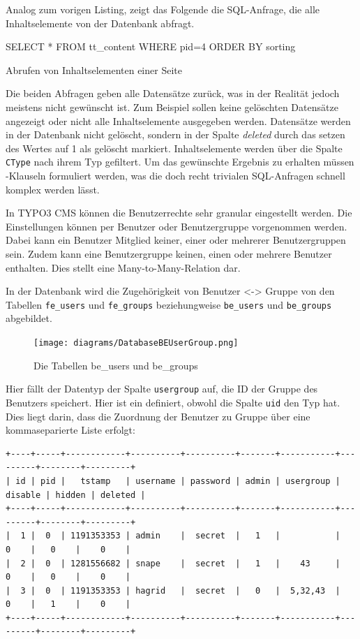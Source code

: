 Analog zum vorigen Listing, zeigt das Folgende die SQL-Anfrage, die alle Inhaltselemente von der Datenbank abfragt.

\begin{listing}
	\begin{phpcode}
SELECT * FROM tt_content WHERE pid=4 ORDER BY sorting
	\end{phpcode}
	\caption{Abrufen von Inhaltselementen einer Seite}
	\label{lst:getContentElements}
\end{listing}

Die beiden Abfragen geben alle Datensätze zurück, was in der Realität jedoch meistens nicht gewünscht ist. Zum Beispiel sollen keine gelöschten Datensätze angezeigt oder nicht alle Inhaltselemente ausgegeben werden. Datensätze werden in der Datenbank nicht gelöscht, sondern in der Spalte \textit{deleted} durch das setzen des Wertes auf 1 als gelöscht markiert. Inhaltselemente werden über die Spalte \texttt{CType} nach ihrem Typ gefiltert. Um das gewünschte Ergebnis zu erhalten müssen -Klauseln formuliert werden, was die doch recht trivialen SQL-Anfragen schnell komplex werden lässt.

In TYPO3 CMS können die Benutzerrechte sehr granular eingestellt werden. Die Einstellungen können per Benutzer oder Benutzergruppe vorgenommen werden.
Dabei kann ein Benutzer Mitglied keiner, einer oder mehrerer Benutzergruppen sein. Zudem kann eine Benutzergruppe keinen, einen oder mehrere Benutzer enthalten. Dies stellt eine Many-to-Many-Relation dar.

In der Datenbank wird die Zugehörigkeit von Benutzer <-> Gruppe von den Tabellen \texttt{fe\_users} und \texttt{fe\_groups} beziehungweise \texttt{be\_users} und \texttt{be\_groups} abgebildet.

\begin{figure}[H]
	\centering
	\texttt{[image: diagrams/DatabaseBEUserGroup.png]}
	\caption{Die Tabellen be\_users und be\_groups}
	\label{fig:beUsersAndBeGroups}
\end{figure}

Hier fällt der Datentyp der Spalte \texttt{usergroup} auf, die ID der Gruppe des Benutzers speichert. Hier ist ein  definiert, obwohl die Spalte \texttt{uid} den Typ  hat. Dies liegt darin, dass die Zuordnung der Benutzer zu Gruppe über eine kommaseparierte Liste erfolgt:

\begin{Verbatim}[samepage=true]
+----+-----+------------+----------+----------+-------+-----------+---------+--------+---------+
| id | pid |   tstamp   | username | password | admin | usergroup | disable | hidden | deleted |
+----+-----+------------+----------+----------+-------+-----------+---------+--------+---------+
|  1 |  0  | 1191353353 | admin    |  secret  |   1   |           |    0    |   0    |    0    |
|  2 |  0  | 1281556682 | snape    |  secret  |   1   |    43     |    0    |   0    |    0    |
|  3 |  0  | 1191353353 | hagrid   |  secret  |   0   |  5,32,43  |    0    |   1    |    0    |
+----+-----+------------+----------+----------+-------+-----------+---------+--------+---------+
\end{Verbatim}

